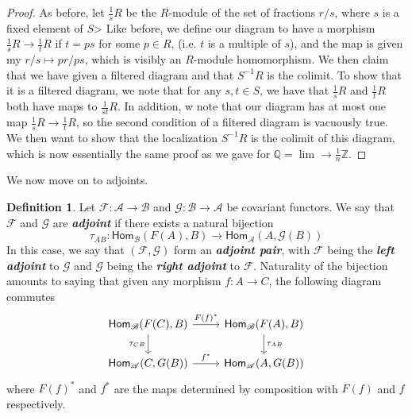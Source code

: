 \documentclass[psamsfonts]{amsart}
\theoremstyle{definition}
\newtheorem{defn}[thm]{Definition}
\theoremstyle{remark}
\renewcommand{\hom}{\mathsf{Hom}}
\newcommand{\ib}[1]{\textbf{\textit{#1}}}
\newcommand{\Q}{\mathbb{Q}}
\newcommand{\Z}{\mathbb{Z}}
\newcommand{\inv}{^{-1}}
\begin{document}
%
\begin{proof}
As before, let $\frac{1}{s}R$ be the $R$-module of the set of fractions $r/s$, where $s$ is a fixed element of $S$> Like before, we define our diagram to have a morphism $\frac{1}{s}R \to \frac{1}{t}R$ if $t = ps$ for some $p \in R$, (i.e. $t$ is a multiple of $s$), and the map is given my $r/s \mapsto pr/ps$, which is visibly an $R$-module homomorphism. We then claim that we have given a filtered diagram and that $S\inv R$ is the colimit. To show that it is a filtered diagram, we note that for any $s,t \in S$, we have that $\frac{1}{s}R$ and $\frac{1}{t}R$ both have maps to $\frac{1}{st}R$. In addition, w note that our diagram has at most one map $\frac{1}{s}R \to \frac{1}{t}R$, so the second condition of a filtered diagram is vacuously true. We then want to show that the localization $S\inv R$ is the colimit of this diagram, which is now essentially the same proof as we gave for $\Q = \lim\limits\to \frac{1}{n}\Z$.
\end{proof}

We now move on to adjoints.
\begin{defn}
Let $\mathcal{F}: \mathscr{A} \to \mathscr{B}$ and $\mathcal{G}: \mathscr{B} \to \mathscr{A}$ be covariant functors. We say that $\mathcal{F}$ and $\mathcal{G}$ are \ib{adjoint} if there exists a natural bijection
$$\tau_{AB} : \hom_{\mathscr{B}}(F(A),B) \to \hom_{\mathscr{A}}(A, \mathcal{G}(B)) $$
In this case, we say that $(\mathcal{F},\mathcal{G})$ form an \ib{adjoint pair}, with $\mathcal{F}$ being the \ib{left adjoint} to $\mathcal{G}$ and $\mathcal{G}$ being the \ib{right adjoint} to $\mathcal{F}$. Naturality of the bijection amounts to saying that given any morphism $f : A \to C$, the following diagram commutes
$$\begin{tikzcd}
\hom_\mathscr{B}(F(C),B) \arrow[d,"\tau_{CB}"']\arrow[r,"F(f)^*"] & \hom_\mathscr{B}(F(A),B) \arrow[d, "\tau_{AB}"] \\
\hom_\mathscr{A}(C,G(B)) \arrow[r, "f^*"] & \hom_\mathscr{A}(A,G(B))
\end{tikzcd}$$
where $F(f)^*$ and $f^*$ are the maps determined by composition with $F(f)$ and $f$ respectively.
\end{defn}
%
\end{document}

